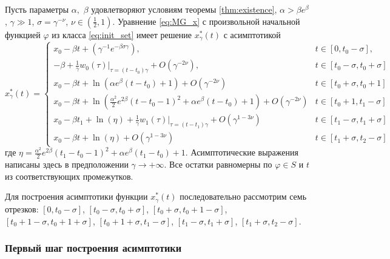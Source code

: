 \begin{theorem}
\label{thm:th_asymp}
Пусть параметры $\alpha,$ $\beta$ удовлетворяют условиям теоремы \ref{thm:existence}, $\alpha > \beta e^{\beta}$, $\gamma \gg 1$, $\sigma = \gamma^{-\nu}$, $\nu \in (\frac{1}{2}, 1)$. Уравнение \eqref{eq:MG_x} с произвольной начальной функцией $\varphi$ из класса \eqref{eq:init_set} имеет решение $x_\gamma^*(t)$ с асимптотикой
\small
\begin{equation}
	\label{eq:sol_x*gamma}
	x^*_\gamma(t)= 
	\begin{cases}
		x_0 - \beta t + (\gamma^{-1} e^{-\beta \sigma \gamma}), & t\in[0, t_0 - \sigma],\\
		-\beta + \frac{1}{\gamma} w_0(\tau)|_{\tau=(t-t_0)\gamma} + O(\gamma^{-2\nu}), & t \in [t_0-\sigma,t_0+\sigma]\\
		x_0 - \beta t + \ln(\alpha e^{\beta}(t - t_0)+1) + O(\gamma^{-2\nu}) & t\in[t_0 + \sigma, t_0 + 1]\\
		x_0 - \beta t + \ln(\frac{\alpha^2}{2}e^{2 \beta}(t - t_0 - 1)^2 + \alpha e^{\beta}(t - t_0) + 1) + O(\gamma^{-2\nu}) & t \in [t_0 + 1, t_1 - \sigma]\\
		x_0 - \beta t_1 + \ln(\eta)+\frac{1}{\gamma} w_1(\tau)|_{\tau=(t - t_1)\gamma} + O(\gamma^{1 - 3\nu}) & t\in[t_1 - \sigma, t_1  +\sigma]\\
		x_0 - \beta t + \ln(\eta) + O(\gamma^{1-3\nu}) & t \in [t_1+\sigma, t_2-\sigma]
	\end{cases}
\end{equation}
\normalsize
где $\eta=\frac{\alpha^2}{2}e^{2\beta}(t_1 - t_0 - 1)^2 + \alpha e^{\beta}(t_1 - t_0) + 1$.
Асимптотические выражения написаны здесь в предположении $\gamma\to+\infty$.
Все остатки равномерны по $\varphi \in S$ и $t$ из соответствующих промежутков.
\end{theorem}

Для построения асимптотики функции $x_\gamma^*(t)$ последовательно рассмотрим семь отрезков:
$[0, t_0 - \sigma]$, 
$[t_0  -\sigma, t_0 + \sigma]$,
$[t_0 + \sigma, t_0 + 1 - \sigma]$,
$[t_0 + 1 - \sigma, t_0 + 1 + \sigma]$,
$[t_0 + 1 + \sigma, t_1 - \sigma]$,
$[t_1 - \sigma, t_1 + \sigma]$,
$[t_1 + \sigma, t_2 - \sigma]$.

\subsubsection{Первый шаг построения асимптотики}

